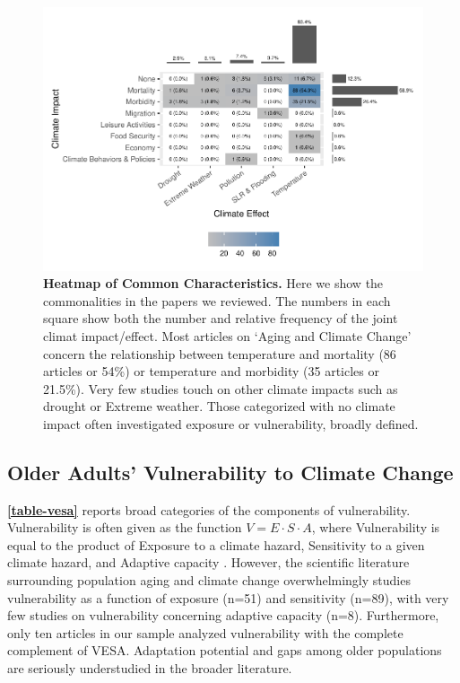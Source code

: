 \documentclass[12pt]{article}
\begin{document}
\begin{figure}
\centering
\includegraphics{MainDocument_files/figure-latex/heatmapcrosstab-1.pdf}
\caption{\textbf{Heatmap of Common Characteristics.} Here we show the
commonalities in the papers we reviewed. The numbers in each square show
both the number and relative frequency of the joint climat
impact/effect. Most articles on `Aging and Climate Change' concern the
relationship between temperature and mortality (86 articles or 54\%) or
temperature and morbidity (35 articles or 21.5\%). Very few studies
touch on other climate impacts such as drought or Extreme weather. Those
categorized with no climate impact often investigated exposure or
vulnerability, broadly defined. \label{fig-heatmap}}
\end{figure}

\hypertarget{older-adults-vulnerability-to-climate-change}{%
\subsection{Older Adults' Vulnerability to Climate
Change}\label{older-adults-vulnerability-to-climate-change}}

\textbf{\autoref{table-vesa}} reports broad categories of the components
of vulnerability. Vulnerability is often given as the function
\(V=E\cdot S \cdot A\), where Vulnerability is equal to the product of
Exposure to a climate hazard, Sensitivity to a given climate hazard, and
Adaptive capacity \citep{field2014climate, parmesan2022climate}.
However, the scientific literature surrounding population aging and
climate change overwhelmingly studies vulnerability as a function of
exposure (n=51) and sensitivity (n=89), with very few studies on
vulnerability concerning adaptive capacity (n=8). Furthermore, only ten
articles in our sample analyzed vulnerability with the complete
complement of VESA. Adaptation potential and gaps among older
populations are seriously understudied in the broader literature.
\end{document}
